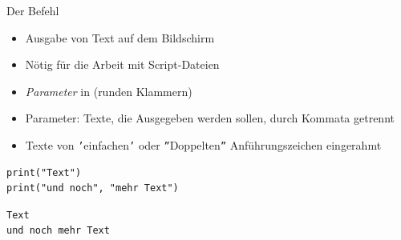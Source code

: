 
\begin{frame}[fragile]{Der Befehl }
%
\begin{itemize}
\item Ausgabe von Text auf dem Bildschirm
\item Nötig für die Arbeit mit Script-Dateien
\item \emph{Parameter} in (runden Klammern)
\item Parameter: Texte, die Ausgegeben werden sollen, durch Kommata getrennt
\item Texte von \texttt{'}einfachen\texttt{'} oder \texttt{''}Doppelten\texttt{''} Anführungszeichen eingerahmt
\end{itemize}

\vspace{10pt}
\begin{minipage}{.49\linewidth}
\begin{codebox}[Code]
\begin{verbatim}
print("Text")
print("und noch", "mehr Text")
\end{verbatim}
\end{codebox}
%
\end{minipage}
\begin{minipage}{.49\linewidth}
\begin{cmdbox}[Ausgabe]
\begin{verbatim}
Text
und noch mehr Text
\end{verbatim}
\end{cmdbox}
\end{minipage}
\end{frame}


